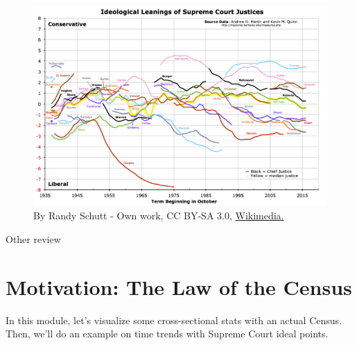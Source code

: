 \documentclass[]{book}
\newenvironment{Shaded}{\begin{snugshade}}{\end{snugshade}}
\theoremstyle{definition}
\theoremstyle{definition}
\theoremstyle{definition}
\theoremstyle{remark}
\begin{document}
\begin{Shaded}
\begin{Highlighting}[]
\begin{Shaded}
\begin{Highlighting}[]
\begin{figure}
\centering
\includegraphics{images/Martin-Quinn_Wikipedia.png}
\caption{By Randy Schutt - Own work, CC BY-SA 3.0, \href{https://commons.wikimedia.org/w/index.php?curid=29585342}{Wikimedia.}}
\end{figure}

Other review

\hypertarget{motivation-the-law-of-the-census}{%
\section{Motivation: The Law of the Census}\label{motivation-the-law-of-the-census}}

In this module, let's visualize some cross-sectional stats with an actual Census. Then, we'll do an example on time trends with Supreme Court ideal points.


\end{Highlighting}
\end{Shaded}
\end{Highlighting}
\end{Shaded}
\end{document}
